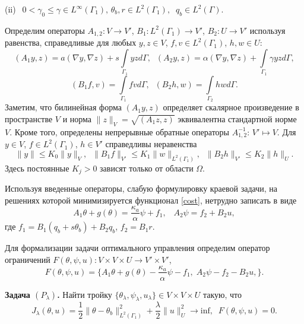 \documentclass[12pt]{article}
\begin{document}
    (ii) $\;\,0<\gamma_0\leq \gamma\in L^\infty(\Gamma_1),\,\theta_b, r \in L^2(\Gamma_1),\;\; q_b\in L^2(\Gamma).$


    Определим операторы $A_{1,2}\colon V \to V'$, $B_1\colon L^2(\Gamma_1)\to V'$,
    $B_2\colon U\to V'$ используя
    равенства, справедливые для любых $y,z \in V$, $f,v\in L^2(\Gamma_1)$,
    $h,w\in U$:
    \[
        (A_1y,z) =a (\nabla y, \nabla z) +
        s\int\limits_{\Gamma_1}yz d\Gamma, \;\;
        (A_2y,z) =\alpha (\nabla y, \nabla z) +
        \int\limits_{\Gamma_1}\gamma yz d\Gamma,
    \]
    $$
    (B_1f, v)
    = \int\limits_{\Gamma_1}fv d\Gamma,\;\; (B_2h, w)
    = \int\limits_{\Gamma_2}hw d\Gamma.
    $$
    Заметим, что
    билинейная форма $(A_1y,z)$ определяет скалярное произведение
    в пространстве $V$ и норма $\|z\|_V=\sqrt{(A_1z,z)}$ эквивалентна
    стандартной норме $V$. Кроме того, определены непрерывные обратные
    операторы
    $A_{1,2}^{-1}:\,V'\mapsto V.$ Для
    $y\in V$, $f\in L^2(\Gamma_1)$, $h\in V'$ справедливы неравенства
    \begin{equation}
        \label{E}
        \|y\|\leq K_0\|y\|_V,\; \; \|B_1f\|_{V'}\leq K_1\|w\|_{L^2(\Gamma_1)},
        \;\;
        \|B_2 h\|_{V'}\leq K_2\|h\|_{U}.
    \end{equation}
    Здесь постоянные $K_j>0$ зависят только от области $\Omega.$

    Используя введенные операторы, слабую формулировку краевой задачи, на решениях которой
    минимизируется функционал \eqref{cost}, нетрудно записать в виде
    \begin{equation}
        \label{CS}
        A_1\theta+g(\theta)=\frac{\kappa_a}{\alpha}\psi+f_1,\;\;\; A_2\psi=f_2+B_2u,
    \end{equation}
    где $f_1=B_1(q_b+s\theta_b)+B_2q_b$, $f_2=B_1r.$

    Для формализации задачи оптимального управления
    определим оператор
    ограничений $F(\theta, \psi, u) : V \times V \times U \rightarrow V' \times V'$,
    \[
        F(\theta, \psi, u) = \{A_1\theta+g(\theta)-\frac{\kappa_a}{\alpha}\psi-f_1 ,\;
        A_2\psi-f_2-B_2u, \}.
    \]


    \textbf{Задача $(P_\lambda)$.} Найти тройку $\{\theta_\lambda, \psi_\lambda, u_\lambda \} \in V \times V \times U$
    такую, что
    \begin{equation}
        \label{CP}
        J_\lambda(\theta, u) = \frac{1}{2}\|\theta -\theta_b\|^2_{L^2(\Gamma_1)}
        + \frac{\lambda}{2}\|u\|^2_U \rightarrow \text{inf},\;\; F(\theta, \psi, u)=0.
    \end{equation}
\end{document}

